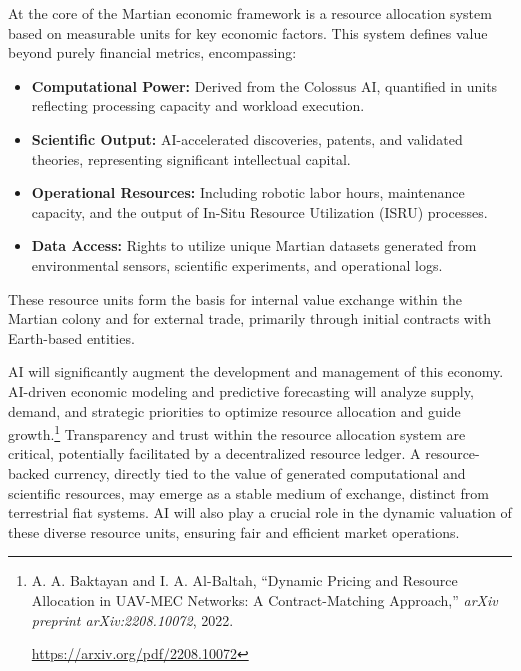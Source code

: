 \documentclass[fontsize=10pt, oneside, DIV=calc]{scrartcl}
\begin{document}
\medskip

\noindent
At the core of the Martian economic framework is a resource allocation system based on measurable units for key economic factors. This system defines value beyond purely financial metrics, encompassing:
\begin{itemize}
    \item \textbf{Computational Power:} Derived from the Colossus AI, quantified in units reflecting processing capacity and workload execution.
    \item \textbf{Scientific Output:} AI-accelerated discoveries, patents, and validated theories, representing significant intellectual capital.
    \item \textbf{Operational Resources:} Including robotic labor hours, maintenance capacity, and the output of In-Situ Resource Utilization (ISRU) processes.
    \item \textbf{Data Access:} Rights to utilize unique Martian datasets generated from environmental sensors, scientific experiments, and operational logs.
\end{itemize}
These resource units form the basis for internal value exchange within the Martian colony and for external trade, primarily through initial contracts with Earth-based entities.

\medskip

\noindent
AI will significantly augment the development and management of this economy. AI-driven economic modeling and predictive forecasting will analyze supply, demand, and strategic priorities to optimize resource allocation and guide growth.\footnote{A. A. Baktayan and I. A. Al-Baltah, ``Dynamic Pricing and Resource Allocation in UAV-MEC Networks: A Contract-Matching Approach,'' \textit{arXiv preprint arXiv:2208.10072}, 2022. 







\href{https://arxiv.org/pdf/2208.10072}\url{https://arxiv.org/pdf/2208.10072}} Transparency and trust within the resource allocation system are critical, potentially facilitated by a decentralized resource ledger. A resource-backed currency, directly tied to the value of generated computational and scientific resources, may emerge as a stable medium of exchange, distinct from terrestrial fiat systems. AI will also play a crucial role in the dynamic valuation of these diverse resource units, ensuring fair and efficient market operations.
\end{document}
